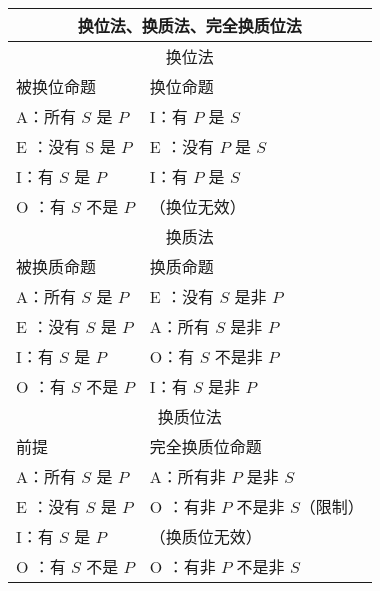 \begin{center}
\begin{tabular}{|l|l|}
\hline
\multicolumn{2}{|c|}{换位法、换质法、完全换质位法} \\
\hline
\multicolumn{2}{|c|}{换位法} \\
\hline
被换位命题 & 换位命题 \\
\hline
A：所有 $S$ 是 $P$ & I：有 $P$ 是 $S$ \\
\hline
E ：没有 S 是 $P$ & E ：没有 $P$ 是 $S$ \\
\hline
I：有 $S$ 是 $P$ & I：有 $P$ 是 $S$ \\
\hline
O ：有 $S$ 不是 $P$ & （换位无效） \\
\hline
\multicolumn{2}{|c|}{换质法} \\
\hline
被换质命题 & 换质命题 \\
\hline
A：所有 $S$ 是 $P$ & E ：没有 $S$ 是非 $P$ \\
\hline
E ：没有 $S$ 是 $P$ & A：所有 $S$ 是非 $P$ \\
\hline
I：有 $S$ 是 $P$ & O：有 $S$ 不是非 $P$ \\
\hline
O ：有 $S$ 不是 $P$ & I：有 $S$ 是非 $P$ \\
\hline
\multicolumn{2}{|c|}{换质位法} \\
\hline
前提 & 完全换质位命题 \\
\hline
A：所有 $S$ 是 $P$ & A：所有非 $P$ 是非 $S$ \\
\hline
E ：没有 $S$ 是 $P$ & O ：有非 $P$ 不是非 $S$（限制） \\
\hline
I：有 $S$ 是 $P$ & （换质位无效） \\
\hline
O ：有 $S$ 不是 $P$ & O ：有非 $P$ 不是非 $S$ \\
\hline
\end{tabular}
\end{center}
